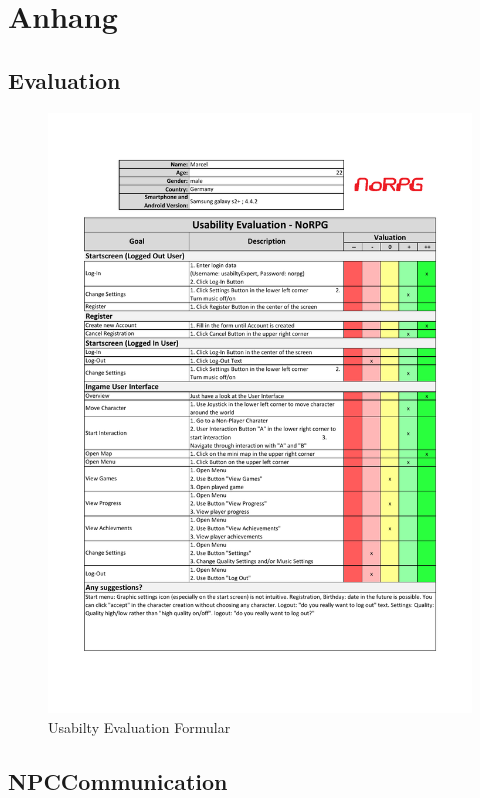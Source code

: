 \chapter*{Anhang}
\section{Evaluation}
	\begin{figure}[htbp]
		\centering 
		\label{ueMarcel}
		\includegraphics[width=\textwidth]{pics/UE-Marcel.pdf}
		\caption{Usabilty Evaluation Formular}
	\end{figure}

\section{NPCCommunication}
